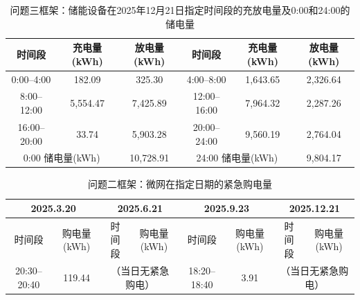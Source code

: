 \begin{table}[H]
  \centering
  \caption{问题三框架：储能设备在2025年12月21日指定时间段的充放电量及0:00和24:00的储电量}
  \label{tab:q4-3-storage-1221}
  \small
  \renewcommand{\arraystretch}{1.3}
  \begin{tabular}{|c|c|c|c|c|c|}
    \hline
    时间段 & 充电量(kWh) & 放电量(kWh) & 时间段 & 充电量(kWh) & 放电量(kWh) \\
    \hline
    0:00--4:00 & 182.09 & 325.30 & 4:00--8:00 & 1{,}643.65 & 2{,}326.64 \\
    \hline
    8:00--12:00 & 5{,}554.47 & 7{,}425.89 & 12:00--16:00 & 7{,}964.32 & 2{,}287.26 \\
    \hline
    16:00--20:00 & 33.74 & 5{,}903.28 & 20:00--24:00 & 9{,}560.19 & 2{,}764.04 \\
    \hline
    \multicolumn{2}{|c|}{0:00 储电量(kWh)} & \multicolumn{1}{c|}{10{,}728.91} & \multicolumn{2}{c|}{24:00 储电量(kWh)} & \multicolumn{1}{c|}{9{,}804.17} \\
    \hline
  \end{tabular}
\end{table}

\begin{table}[H]
  \centering
  \caption{问题二框架：微网在指定日期的紧急购电量}
  \label{tab:q4-2-specific-emergency}
  \tiny
  \renewcommand{\arraystretch}{1.2}
  \begin{tabular}{|c|c|c|c|c|c|c|c|}
    \hline
    \multicolumn{2}{|c|}{2025.3.20} & \multicolumn{2}{c|}{2025.6.21} & \multicolumn{2}{c|}{2025.9.23} & \multicolumn{2}{c|}{2025.12.21} \\
    \hline
    时间段 & 购电量(kWh) & 时间段 & 购电量(kWh) & 时间段 & 购电量(kWh) & 时间段 & 购电量(kWh) \\
    \hline
    20:30--20:40 & 119.44 & \multicolumn{2}{c|}{（当日无紧急购电）} & 18:20--18:40 & 3.91 & \multicolumn{2}{c|}{（当日无紧急购电）} \\
    \hline
  \end{tabular}
\end{table}

